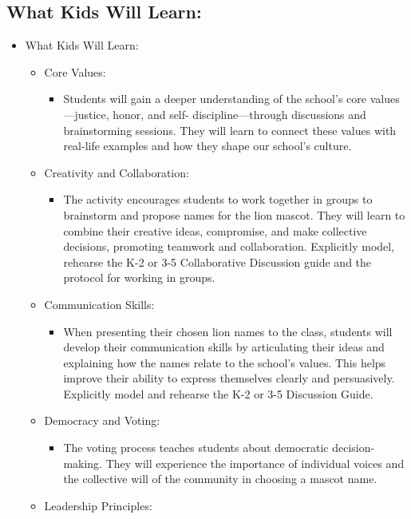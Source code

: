 \documentclass[14pt, letterpaper, twoside]{article}
\begin{document}
	\subsection{What Kids Will Learn:}
	\begin{itemize}
	\item What Kids Will Learn:
		\begin{itemize}
		\item Core Values: 
			\begin{itemize}
			\item Students will gain a deeper understanding of the school's core values—justice, honor, and self-     			discipline—through discussions and brainstorming sessions. They will learn to connect these values 					with real-life examples and how they shape our school's culture.
			\end{itemize}
		\item Creativity and Collaboration: 
			\begin{itemize}
			\item The activity encourages students to work together in groups to brainstorm and propose names for the lion mascot. They will learn to combine their creative ideas, compromise, and make collective decisions, promoting teamwork and collaboration. Explicitly model, rehearse the K-2 or 3-5 Collaborative Discussion guide and the protocol for working in groups.
			\end{itemize}
		\item Communication Skills:
			\begin{itemize}
			\item When presenting their chosen lion names to the class, students will develop their communication 					skills by articulating their ideas and explaining how the names relate to the school's values. This 					helps improve their ability to express themselves clearly and persuasively. Explicitly model and rehearse the K-2 or 3-5 Discussion Guide.
			\end{itemize}
    		\item Democracy and Voting: 
    			\begin{itemize}
    			\item The voting process teaches students about democratic decision-making. They will experience the 					importance of individual voices and the collective will of the community in choosing a mascot name.
			\end{itemize}
		\item Leadership Principles:
			\begin{itemize}

\end{itemize}
\end{itemize}
\end{itemize}
\end{document}

